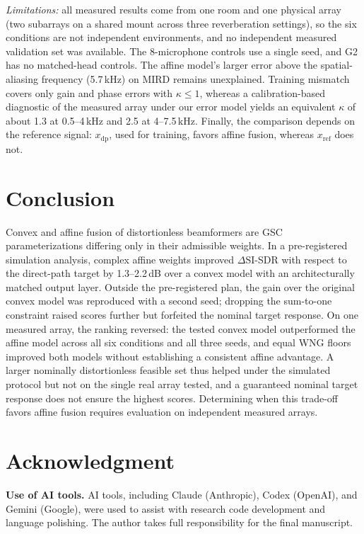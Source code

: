 \documentclass[journal]{IEEEtran}
\begin{document}
\emph{Limitations:} all measured results come from one room and one physical array (two subarrays on a shared mount across three reverberation settings), so the six conditions are not independent environments, and no independent measured validation set was available. The 8-microphone controls use a single seed, and G2 has no matched-head controls. The affine model's larger error above the spatial-aliasing frequency (5.7\,kHz) on MIRD remains unexplained. Training mismatch covers only gain and phase errors with $\kappa\le1$, whereas a calibration-based diagnostic of the measured array under our error model yields an equivalent $\kappa$ of about 1.3 at 0.5--4\,kHz and 2.5 at 4--7.5\,kHz. Finally, the comparison depends on the reference signal: $x_{\mathrm{dp}}$, used for training, favors affine fusion, whereas $x_{\mathrm{ref}}$ does not.

\section{Conclusion}
Convex and affine fusion of distortionless beamformers are GSC parameterizations differing only in their admissible weights. In a pre-registered simulation analysis, complex affine weights improved $\Delta$SI-SDR with respect to the direct-path target by 1.3--2.2\,dB over a convex model with an architecturally matched output layer. Outside the pre-registered plan, the gain over the original convex model was reproduced with a second seed; dropping the sum-to-one constraint raised scores further but forfeited the nominal target response. On one measured array, the ranking reversed: the tested convex model outperformed the affine model across all six conditions and all three seeds, and equal WNG floors improved both models without establishing a consistent affine advantage. A larger nominally distortionless feasible set thus helped under the simulated protocol but not on the single real array tested, and a guaranteed nominal target response does not ensure the highest scores. Determining when this trade-off favors affine fusion requires evaluation on independent measured arrays.

\section*{Acknowledgment}
\textbf{Use of AI tools.} AI tools, including Claude (Anthropic), Codex (OpenAI), and Gemini (Google), were used to assist with research code development and language polishing. The author takes full responsibility for the final manuscript.



\end{document}
